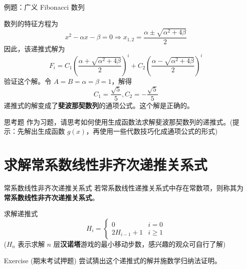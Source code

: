 \documentclass{beamer}
\begin{document}
\begin{frame}{例题：广义 Fibonacci 数列}
    \begin{solution}
        数列的特征方程为
        $$
        x^2 - \alpha x - \beta = 0 \Longrightarrow x_{1,2} = \frac{\alpha \pm \sqrt{\alpha^2 + 4\beta}}{2}
        $$
        \pause
        因此，该递推式解为
        $$
        F_i = C_1 \left(\frac{\alpha + \sqrt{\alpha^2 + 4\beta}}{2}\right)^i + C_2 \left(\frac{\alpha - \sqrt{\alpha^2 + 4\beta}}{2}\right)^i
        $$
        验证这个解。令 $A = B = \alpha = \beta = 1$，解得
        \begin{displaymath}
            C_1 = \frac{\sqrt 5}{5}, C_2 = -\frac{\sqrt 5}{5}
        \end{displaymath}
        递推式的解变成了\textbf{斐波那契数列}的通项公式。这个解是正确的。
    \end{solution}

\end{frame}

\begin{frame}{思考题}
    作为习题，请思考如何使用生成函数法求解斐波那契数列的递推式。(提示：先解出生成函数 $g(x)$，再使用一些代数技巧化成通项公式的形式)
\end{frame}

\section{求解常系数线性非齐次递推关系式}

\begin{frame}{常系数线性非齐次递推关系式}
    若常系数线性递推关系式中存在常数项，则称其为\textbf{常系数线性非齐次递推关系式}。
    \pause
    \begin{example}[Hanoi 问题]
        求解递推式
        \begin{displaymath}
            H_i = \begin{cases} 
                0 & i=0\\
                2H_{i-1} + 1 & i\geqslant 1
              \end{cases}
        \end{displaymath}
        ($H_n$ 表示求解 $n$ 层\textbf{汉诺塔}游戏的最小移动步数，感兴趣的观众可自行了解)
    \end{example}
    \pause
    \begin{block}{Exercise (期末考试押题)}
        尝试猜出这个递推式的解并施数学归纳法证明。
    \end{block}
\end{frame}
\end{document}

